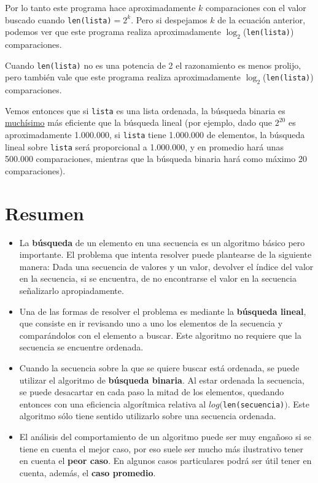 Por lo tanto este programa hace aproximadamente $k$ comparaciones con el valor
buscado cuando \lstinline+len(lista)+$= 2^k$.
Pero si despejamos $k$ de la ecuación anterior, podemos ver que este programa
realiza aproximadamente $\log_2$(\lstinline+len(lista)+) comparaciones.

Cuando \lstinline+len(lista)+ no es una potencia de 2 el razonamiento es menos
prolijo, pero también vale que este programa realiza aproximadamente
$\log_2$(\lstinline+len(lista)+) comparaciones.

Vemos entonces que si \lstinline!lista! es una lista ordenada, la búsqueda binaria es
\underline{muchísimo} más eficiente que la búsqueda lineal (por ejemplo, dado
que $2^{20}$ es aproximadamente 1.000.000, si \lstinline!lista! tiene 1.000.000 de
elementos, la búsqueda lineal sobre \lstinline+lista+ será proporcional a 1.000.000, y
en promedio hará unas 500.000 comparaciones, mientras que la búsqueda binaria
hará como máximo 20 comparaciones).

\section{Resumen}

\begin{itemize}

\item La {\bf búsqueda} de un elemento en una secuencia es un
algoritmo básico pero importante. El problema que intenta resolver puede
plantearse de la siguiente manera: Dada una secuencia de valores y un
valor, devolver el índice del valor en la secuencia, si se encuentra, de no
encontrarse el valor en la secuencia señalizarlo apropiadamente.

\item Una de las formas de resolver el problema es mediante la {\bf
búsqueda lineal}, que consiste en ir revisando uno a uno los elementos de
la secuencia y comparándolos con el elemento a buscar.  Este algoritmo no
requiere que la secuencia se encuentre ordenada.

\item Cuando la secuencia sobre la que se quiere buscar está ordenada, se
puede utilizar el algoritmo de {\bf búsqueda binaria}.  Al estar ordenada
la secuencia, se puede desacartar en cada paso la mitad de los elementos,
quedando entonces con una eficiencia algorítmica relativa al
$log($\lstinline!len(secuencia)!$)$. Este algoritmo sólo tiene sentido
utilizarlo sobre una secuencia ordenada.

\item El análisis del comportamiento de un algoritmo puede ser muy engañoso
si se tiene en cuenta el mejor caso, por eso suele ser mucho más
ilustrativo tener en cuenta el {\bf peor caso}.  En algunos casos
particulares podrá ser útil tener en cuenta, además, el {\bf caso
promedio}.
\end{itemize}


